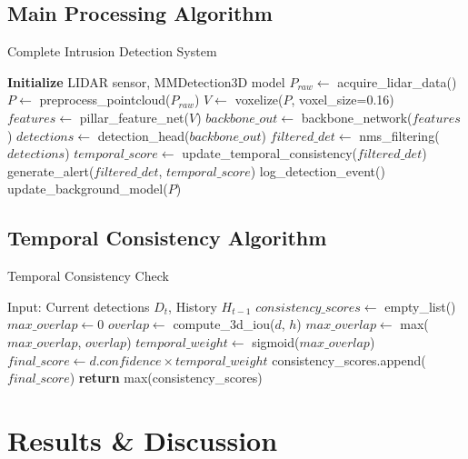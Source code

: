 \documentclass[conference]{IEEEtran}
\begin{document}
\subsection{Main Processing Algorithm}
\begin{algorithm}
\caption{Complete Intrusion Detection System}
\begin{algorithmic}[1]
\STATE \textbf{Initialize} LIDAR sensor, MMDetection3D model
    \STATE $P_{raw} \leftarrow$ acquire\_lidar\_data()
    \STATE $P \leftarrow$ preprocess\_pointcloud($P_{raw}$)
    \STATE $V \leftarrow$ voxelize($P$, voxel\_size=0.16)
    \STATE $features \leftarrow$ pillar\_feature\_net($V$)
    \STATE $backbone\_out \leftarrow$ backbone\_network($features$)
    \STATE $detections \leftarrow$ detection\_head($backbone\_out$)
    \STATE $filtered\_det \leftarrow$ nms\_filtering($detections$)
    \STATE $temporal\_score \leftarrow$ update\_temporal\_consistency($filtered\_det$)
        \STATE generate\_alert($filtered\_det$, $temporal\_score$)
        \STATE log\_detection\_event()
    \ENDIF
    \STATE update\_background\_model($P$)
\ENDWHILE
\end{algorithmic}
\end{algorithm}

\subsection{Temporal Consistency Algorithm}
\begin{algorithm}
\caption{Temporal Consistency Check}
\begin{algorithmic}[1]
\STATE Input: Current detections $D_t$, History $H_{t-1}$
\STATE $consistency\_scores \leftarrow$ empty\_list()
    \STATE $max\_overlap \leftarrow 0$
        \STATE $overlap \leftarrow$ compute\_3d\_iou($d$, $h$)
        \STATE $max\_overlap \leftarrow$ max($max\_overlap$, $overlap$)
    \ENDFOR
    \STATE $temporal\_weight \leftarrow$ sigmoid($max\_overlap$)
    \STATE $final\_score \leftarrow d.confidence \times temporal\_weight$
    \STATE consistency\_scores.append($final\_score$)
\ENDFOR
\STATE \textbf{return} max(consistency\_scores)
\end{algorithmic}
\end{algorithm}

\section{Results \& Discussion}
\end{document}
